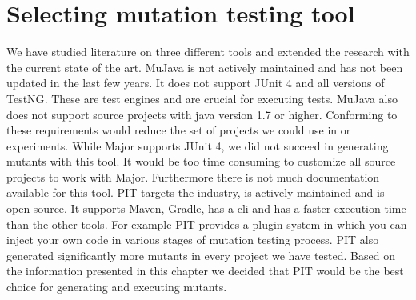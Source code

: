 \documentclass[../main]{subfiles}
\begin{document}
\section{Selecting mutation testing tool}
We have studied literature on three different tools and extended the research with the current state of the art.
MuJava is not actively maintained and has not been updated in the last few years.
It does not support JUnit 4 and all versions of TestNG\cite{mujava}.
These are test engines and are crucial for executing tests.
MuJava also does not support source projects with java version 1.7 or higher\cite{mujava}.
Conforming to these requirements would reduce the set of projects we could use in or experiments.
\newline
While Major supports JUnit 4,
we did not succeed in generating mutants with this tool.
It would be too time consuming to customize all source projects to work with Major.
Furthermore there is not much documentation available for this tool.
\newline
PIT targets the industry, is actively maintained and is open source\cite{Kintis2016AnalysingStudy}.
It supports Maven, Gradle, has a \acrfull{cli} and has a faster execution time than the other tools.
For example PIT provides a plugin system in which you can inject your own code in various stages of mutation testing process\cite{pit}.
PIT also generated significantly more mutants in every project we have tested.
Based on the information presented in this chapter we decided that PIT would be the best choice for generating and executing mutants.
\end{document}
